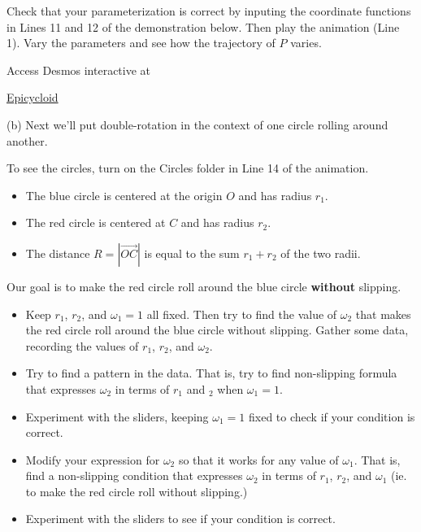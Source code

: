 \documentclass{ximera}
\begin{document}
\begin{exploration}
\begin{itemize}
\end{itemize}


Check that your parameterization is correct by inputing the coordinate functions in Lines 11 and 12 of the demonstration below. Then play the animation (Line 1). Vary the parameters and see how the trajectory of $P$ varies.

Access Desmos interactive at
 
\href{https://www.desmos.com/calculator/c2i8y3oaxe}{Epicycloid}

 
\begin{onlineOnly}
    \begin{center}
\end{center}
\end{onlineOnly}


(b) Next we'll put double-rotation in the context of one circle rolling around another.

To see the circles, turn on the Circles folder in Line 14 of the animation.

\begin{itemize}

\item{The blue circle is centered at the origin $O$ and has radius $r_1$.}

\item{The red circle is centered at $C$ and has radius $r_2$.}
 
\item{The distance $R = |\overrightarrow{OC}|$ is equal to the sum $r_1+r_2$ of the two radii.}

\end{itemize}

Our goal is to make the red circle roll around the blue circle {\bf without} slipping. 

\begin{itemize}

\item{ Keep $r_1$, $r_2$, and $\omega_1=1$ all fixed. Then try to find the value of $\omega_2$ that makes the red circle roll around the blue circle without slipping. Gather some data, recording the values of $r_1$, $r_2$, and $\omega_2$.}

\item{Try to find a pattern in the data. That is, try to find non-slipping formula that expresses $\omega_2$ in terms of $r_1$ and $_2$ when $\omega_1=1$.}

\item{Experiment with the sliders, keeping $\omega_1=1$ fixed to check if your condition is correct.}

\item{Modify your expression for $\omega_2$ so that it works for any value of $\omega_1$. That is, find a non-slipping condition that expresses $\omega_2$ in terms of $r_1$, $r_2$, and $\omega_1$ (ie. to make the red circle roll without slipping.)}

\item{Experiment with the sliders to see if your condition is correct.}

\end{itemize}


\end{exploration}
\end{document}
